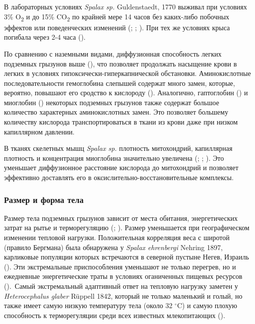 В лабораторных условиях \textit{Spalax sp.} Guldenstaedt, 1770 выживал при условиях 3\% O\textsubscript{2} и до 15\% CO\textsubscript{2} по крайней мере 14 часов без каких-либо побочных эффектов или поведенческих изменений (\cite{Avivi1999}; \cite{Shams2005a}; \cite{Shams2005}). При тех же условиях крыса погибала через 2-4 часа (\cite{Avivi1999}). 

По сравнению с наземными видами, диффузионная способность легких подземных грызунов выше (\cite{Widmer1997}), что позволяет продолжать насыщение крови в легких в условиях гипоксически-гиперкапнической обстановки. Аминокислотные последовательности гемоглобина слепышей содержат много замен, которые, вероятно, повышают его сродство к кислороду (\cite{KLEINSCHMIDT1984}). Аналогично, гаптоглобин (\cite{Lacey2000}) и миоглобин (\cite{Gurnett1984}) некоторых подземных грызунов также содержат большое количество характерных аминокислотных замен. Это позволяет большему количеству кислорода транспортироваться в ткани из крови даже при низком капиллярном давлении.

В тканях скелетных мышц \textit{Spalax sp.} плотность митохондрий, капиллярная плотность и концентрация миоглобина значительно увеличена (\cite{Avivi1999}; \cite{Widmer1997}; \cite{Arieli1979}). Это уменьшает диффузионное расстояние кислорода до митохондрий и позволяет эффективно доставлять его в оксислительно-восстановительные комплексы.

\subsubsection{Размер и форма тела}

Размер тела подземных грызунов зависит от места обитания, энергетических затрат на рытье и терморегуляцию (\cite{Vleck1979}; \cite{McNab1979}). Размер уменьшается при географическом изменении тепловой нагрузки. Положительная корреляция веса с широтой (правило Бергмана) была обнаружена у \textit{Spalax ehrenbergi} Nehring 1897, карликовые популяции которых встречаются в северной пустыне Негев, Израиль (\cite{McNab1966}). Эти экстремальные приспособления уменьшают не только перегрев, но и ежедневные энергетические траты в условиях оганиченных пищевых ресурсов (\cite{McNab1980}). Самый экстремальный адаптивный ответ на тепловую нагрузку заметен у \textit{Heterocephalus glaber} Rüppell 1842, который не только маленький и голый, но также имеет самую низкую температуру тела (около 32 $^\circ$C) и самую плохую способность к терморегуляции среди всех известных млекопитающих (\cite{McNab1966}). 


